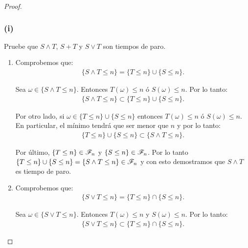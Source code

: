 \begin{proof}
                \subsubsection{(i)} 
                	Pruebe que $ S \wedge T $, $ S + T $ y $ S \vee T$ son tiempos de paro.\\
                
                	\begin{enumerate}
                		\item 
                			Comprobemos que:
                			\begin{align}
                				\{ S \wedge T \leq n \} = \{ T \leq n \} \cup \{ S \leq n\}.
                			\end{align}
                			
							Sea $\omega \in \{ S \wedge T \leq n \}$. Entonces $T(\omega) \leq n$ ó $S(\omega) \leq n$.
							Por lo tanto:
							\begin{align}
		                			\{ S \wedge T \leq n \} \subset \{ T \leq n \} \cup \{ S \leq n\}.							
							\end{align}
							
							Por otro lado, si $\omega \in \{ T \leq n \} \cup \{ S \leq n\}$ entonces $T(\omega) \leq n$ ó $S(\omega) \leq n$.
							En particular, el mínimo tendrá que ser menor que $n$ y por lo tanto:
							\begin{align}
		                			\{ T \leq n \} \cup \{ S \leq n\} \subset \{ S \wedge T \leq n \}.						
							\end{align}
							
							Por último, $\{ T \leq n \} \in \mathscr{F}_n$ y $\{ S \leq n \} \in \mathscr{F}_n$. Por lo tanto	\\	
							$\{ T \leq n \} \cup \{ S \leq n\} = \{ S \wedge T \leq n \} \in \mathscr{F}_n$ y con esto demostramos que 
							$ S \wedge T$ es tiempo de paro.\\
							
						\item
							Comprobemos que:
                			\begin{align}
                				\{ S \vee T \leq n \} = \{ T \leq n \} \cap \{ S \leq n\}.
                			\end{align}
                			
							Sea $\omega \in \{ S \vee T \leq n \}$. Entonces $T(\omega) \leq n$ y $S(\omega) \leq n$.
							Por lo tanto:
							\begin{align}
		                			\{ S \vee T \leq n \} \subset \{ T \leq n \} \cap \{ S \leq n\}.							
							\end{align}
							

\end{enumerate}
\end{proof}

